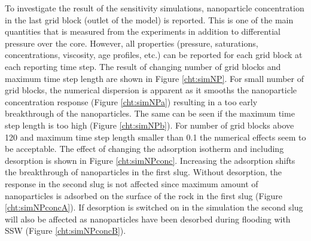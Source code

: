 To investigate the result of the sensitivity simulations, nanoparticle concentration in the last grid block (outlet of the model) is reported. This is one of the main quantities that is measured from the experiments in addition to differential pressure over the core. However, all properties (pressure, saturations, concentrations, viscosity, age profiles, etc.) can be reported for each grid block at each reporting time step. 
The result of changing number of grid blocks and maximum time step length are shown in Figure \ref{cht:simNP}. For small number of grid blocks, the numerical dispersion is apparent as it smooths the nanoparticle concentration response (Figure \ref{cht:simNPa}) resulting in a too early breakthrough of the nanoparticles. The same can be seen if the maximum time step length is too high (Figure \ref{cht:simNPb}). For number of grid blocks above 120 and maximum time step length smaller than 0.1 the numerical effects seem to be acceptable. The effect of changing the adsorption isotherm and including desorption is shown in Figure \ref{cht:simNPconc}. Increasing the adsorption shifts the breakthrough of nanoparticles in the first slug. Without desorption, the response in the second slug is not affected since maximum amount of nanoparticles is adsorbed on the surface of the rock in the first slug (Figure \ref{cht:simNPconcA}). If desorption is switched on in the simulation the second slug will also be affected as nanoparticles have been desorbed during flooding with SSW (Figure \ref{cht:simNPconcB}). 

